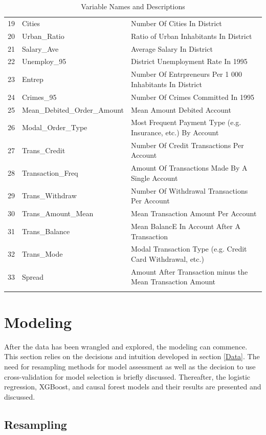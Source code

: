 \documentclass[11pt,preprint, authoryear]{elsarticle}
\numberwithin{equation}{section}
\numberwithin{figure}{section}
\numberwithin{table}{section}
\begin{document}
\begin{longtable}{rll}
  19 & Cities & Number Of Cities In District \\ 
  20 & Urban\_Ratio & Ratio of Urban Inhabitants In District \\ 
  21 & Salary\_Ave & Average Salary In District \\ 
  22 & Unemploy\_95 & District Unemployment Rate In 1995 \\ 
  23 & Entrep & Number Of Entrpreneurs Per 1 000 Inhabitants In District \\ 
  24 & Crimes\_95 & Number Of Crimes Committed In 1995 \\ 
  25 & Mean\_Debited\_Order\_Amount & Mean Amount Debited Account \\ 
  26 & Modal\_Order\_Type & Most Frequent Payment Type (e.g. Insurance, etc.) By Account \\ 
  27 & Trans\_Credit & Number Of Credit Transactions Per Account \\ 
  28 & Transaction\_Freq & Amount Of Transactions Made By A Single Account \\ 
  29 & Trans\_Withdraw & Number Of Withdrawal Transactions Per Account \\ 
  30 & Trans\_Amount\_Mean & Mean Transaction Amount Per Account \\ 
  31 & Trans\_Balance & Mean BalancE In Account After A Transaction \\ 
  32 & Trans\_Mode & Modal Transaction Type (e.g. Credit Card Withdrawal, etc.) \\ 
  33 & Spread & Amount After Transaction minus the Mean Transaction Amount \\ 
   \hline
\hline
\caption{Variable Names and Descriptions \label{VariableTable}} 
\end{longtable}

\hypertarget{modeling}{%
\section{Modeling}\label{modeling}}

After the data has been wrangled and explored, the modeling can
commence. This section relies on the decisions and intuition developed
in section \ref{Data}. The need for resampling methods for model
assessment as well as the decision to use cross-validation for model
selection is briefly discussed. Thereafter, the logistic regression,
XGBoost, and causal forest models and their results are presented and
discussed.

\hypertarget{resampling}{%
\subsection{Resampling}\label{resampling}}
\end{document}
